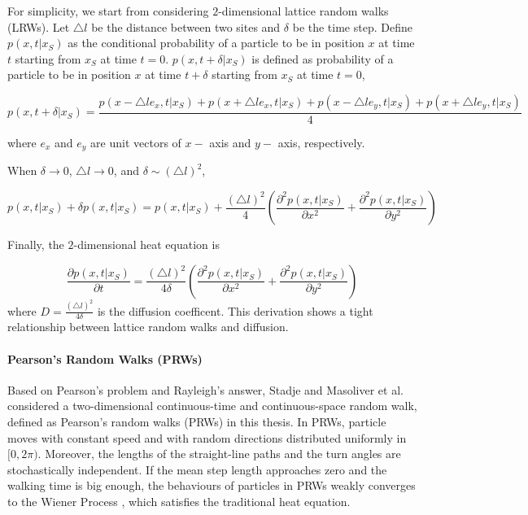 For simplicity, we start from considering $2$-dimensional lattice random walks (LRWs). Let $\triangle l$ be the distance between two sites and $\delta$ be the time step. Define $p(x,t| x_{S})$ as the conditional probability of a particle to be in position $x$ at time $t$ starting from $x_{S}$ at time $t=0$. $p(x, t + \delta |x_{S})$ is defined as probability of a particle to be in position $x$ at time $t + \delta$ starting from $x_{S}$ at time $t=0$, \cite{lawler2010random}


\begin{equation}\label{eq:lrws_next}
  p(x, t + \delta | x_{S}) = \frac{p(x - \triangle l e_{x}, t| x_{S}) +
    p(x + \triangle l e_{x}, t| x_{S}) + p(x - \triangle l e_{y}, t|
    x_{S}) + p(x + \triangle l e_{y}, t| x_{S})}{4}
\end{equation}

where $e_x$ and $e_y$ are unit vectors of $x-$ axis and $y-$ axis, respectively.


When $\delta \rightarrow 0$, $\triangle l \rightarrow 0$, and $\delta \sim (\triangle l)^2$, 

\begin{equation}\label{eq:lrws_prob}
  p(x, t | x_{S}) + \delta p(x, t | x_{S}) = p(x, t | x_{S}) +
  \frac{(\triangle l)^2}{4} (\frac{\partial ^2 p(x, t|
    x_{S})}{\partial x^2} + \frac{\partial^2 p (x, t| x_{S})}{\partial
    y^2})
\end{equation}

Finally, the $2$-dimensional heat equation is

\begin{equation}\label{eq:lrws_heat}
  \frac{\partial p(x, t| x_{S})}{\partial t} = \frac{(\triangle
    l)^2}{4 \delta} (\frac{\partial ^2 p(x, t| x_{S})}{\partial x^2} +
  \frac{\partial^2 p (x, t| x_{S})}{\partial y^2})
\end{equation}
where $D = \frac{(\triangle l)^2}{4 \delta}$ is the diffusion coefficent. This derivation shows a tight relationship between lattice random walks and diffusion.



\paragraph{Pearson's Random Walks (PRWs)}

Based on Pearson's problem and Rayleigh's answer, Stadje
\cite{stadje1987exact} and Masoliver et al. \cite{masoliver1993some} considered a two-dimensional continuous-time and continuous-space random walk, defined as Pearson's random walks (PRWs) in this thesis. In PRWs, particle moves with constant speed and with random directions distributed uniformly in $[0, 2\pi)$. Moreover, the lengths of the straight-line paths and the turn angles are stochastically independent. If the mean step length approaches zero and the walking time is big enough, the behaviours of particles in PRWs weakly converges to the Wiener Process \cite{stadje1987exact}, which satisfies the traditional heat equation.
